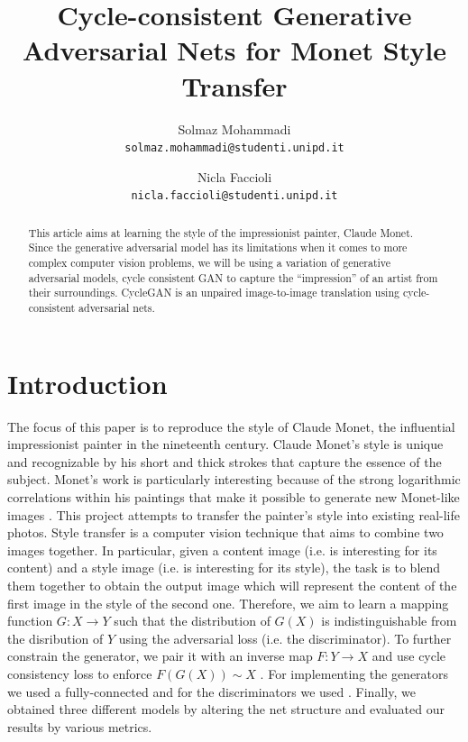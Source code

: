 \documentclass[10pt,twocolumn,letterpaper]{article}
\begin{document}
\title{Cycle-consistent Generative Adversarial Nets for Monet Style Transfer}

\author{Solmaz Mohammadi\\
{\tt\small solmaz.mohammadi@studenti.unipd.it}
\and
Nicla Faccioli\\
{\tt\small nicla.faccioli@studenti.unipd.it}
}

\maketitle

\begin{abstract}
This article aims at learning the style of the impressionist
painter, Claude Monet. Since the generative adversarial
model has its limitations when it comes to more complex
computer vision problems, we will be using a variation
of generative adversarial models, cycle consistent GAN to capture the
“impression” of an artist from their surroundings. CycleGAN is an unpaired image-to-image translation using cycle-consistent adversarial nets.
\end{abstract}

\section{Introduction}
The focus of this paper is to reproduce the style of Claude Monet, the
influential impressionist painter in the nineteenth century. Claude Monet’s style is unique and recognizable by his short and thick strokes that capture the essence of the subject. Monet’s work is particularly interesting because of the strong logarithmic correlations within his paintings that make it possible to generate new Monet-like images \cite{monetlog}.
This project attempts to transfer the painter's style into existing real-life photos. Style transfer is a computer vision technique that aims to combine two images together. In particular, given a content image (i.e. is interesting for its content) and a style image (i.e. is interesting for its style), the task is to blend them together to obtain the output image which will represent the content of the first image in the style of the second one. Therefore, we aim to learn a mapping function $G: X\longrightarrow Y$ such that the distribution of $G(X)$ is indistinguishable from the disribution of $Y$ using the adversarial loss (i.e. the discriminator). To further constrain the generator, we pair it with an inverse map $F:Y \longrightarrow X$ and use cycle consistency loss to enforce $F(G(X))\sim X$ \cite{cyclegan}. For implementing the generators we used a fully-connected  and for the discriminators we used . Finally, we obtained three different models by altering the net structure and evaluated our results by various metrics.
\end{document}

